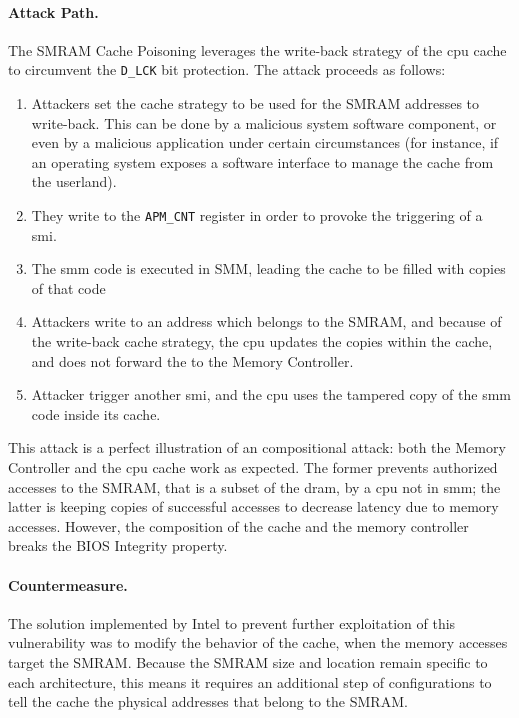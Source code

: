 \paragraph{Attack Path.}
%
The SMRAM Cache Poisoning leverages the write-back strategy of the \ac{cpu}
cache to circumvent the \texttt{D\_LCK} bit protection.
%
The attack proceeds as follows:

\begin{enumerate}
\item Attackers set the cache strategy to be used for the SMRAM addresses to
  write-back.
  This can be done by a malicious system software component, or even by a
  malicious application under certain circumstances (for instance, if an
  operating system exposes a software interface to manage the cache from the
  userland).

%
\item They write to the \texttt{APM\_CNT} register in order to provoke the
  triggering of a \ac{smi}.
%
\item The \ac{smm} code is executed in SMM, leading the cache to be filled with
  copies of that code
%
\item Attackers write to an address which belongs to the SMRAM, and because of
  the write-back cache strategy, the \ac{cpu} updates the copies within the
  cache, and does not forward the \IO to the Memory Controller.
%
\item Attacker trigger another \ac{smi}, and the \ac{cpu} uses the tampered copy
  of the \ac{smm} code inside its cache.
\end{enumerate}
%
This attack is a perfect illustration of an compositional attack:
%
both the Memory Controller and the \ac{cpu} cache work as expected.
%
The former prevents authorized accesses to the SMRAM, that is a subset of the
\ac{dram}, by a \ac{cpu} not in \ac{smm};
%
the latter is keeping copies of successful accesses to decrease latency due to
memory accesses.
%
However, the composition of the cache and the memory controller breaks the BIOS
Integrity property.

\paragraph{Countermeasure.}
%
The solution implemented by Intel to prevent further exploitation of this
vulnerability was to modify the behavior of the cache, when the memory accesses
target the SMRAM.
%
Because the SMRAM size and location remain specific to each architecture, this
means it requires an additional step of configurations to tell the cache the
physical addresses that belong to the SMRAM.

